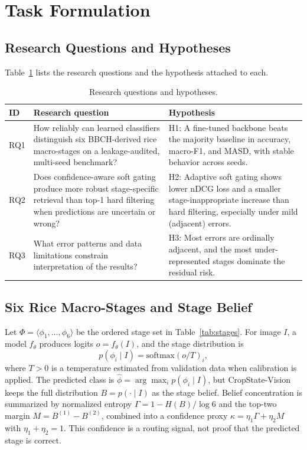 \documentclass{llncs}
\begin{document}
\section{Task Formulation}

\subsection{Research Questions and Hypotheses}

Table~\ref{tab:rq} lists the research questions and the hypothesis attached to each.

\begin{table}[t]
\centering
\caption{Research questions and hypotheses.}
\label{tab:rq}
\small
\begin{tabular}{p{}p{}p{}}
\toprule
\textbf{ID} & \textbf{Research question} & \textbf{Hypothesis} \\
\midrule
RQ1 & How reliably can learned classifiers distinguish six BBCH-derived rice macro-stages on a leakage-audited, multi-seed benchmark? &
H1: A fine-tuned backbone beats the majority baseline in accuracy, macro-F1, and MASD, with stable behavior across seeds. \\[4pt]
RQ2 & Does confidence-aware soft gating produce more robust stage-specific retrieval than top-1 hard filtering when predictions are uncertain or wrong? &
H2: Adaptive soft gating shows lower nDCG loss and a smaller stage-inappropriate increase than hard filtering, especially under mild (adjacent) errors. \\[4pt]
RQ3 & What error patterns and data limitations constrain interpretation of the results? &
H3: Most errors are ordinally adjacent, and the most under-represented stages dominate the residual risk. \\
\bottomrule
\end{tabular}
\end{table}

\subsection{Six Rice Macro-Stages and Stage Belief}

Let $\Phi = \langle \phi_1,\dots,\phi_6 \rangle$ be the ordered stage set in Table~\ref{tab:stages}. For image $I$, a model $f_\theta$ produces logits $o = f_\theta(I)$, and the stage distribution is
\begin{equation}
p(\phi_i \mid I) = \mathrm{softmax}(o/T)_i,
\label{eq:softmax}
\end{equation}
where $T > 0$ is a temperature estimated from validation data when calibration is applied. The predicted class is $\hat{\phi} = \arg\max_i p(\phi_i \mid I)$, but CropState-Vision keeps the full distribution $B=p(\cdot\mid I)$ as the stage belief. Belief concentration is summarized by normalized entropy $\Gamma = 1 - H(B)/\log 6$ and the top-two margin $M = B^{(1)} - B^{(2)}$, combined into a confidence proxy $\kappa = \eta_1\Gamma + \eta_2 M$ with $\eta_1+\eta_2=1$. This confidence is a routing signal, not proof that the predicted stage is correct.
\end{document}
